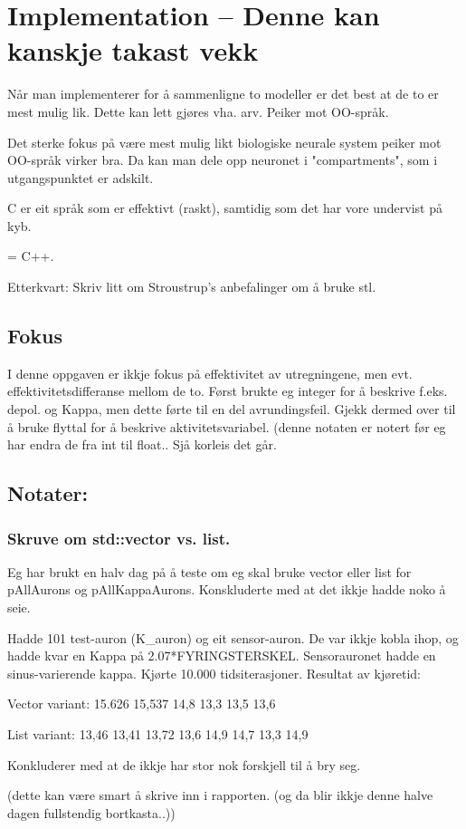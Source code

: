 
\chapter{ Implementation  -- Denne kan kanskje takast vekk}


	Når man implementerer for å sammenligne to modeller er det best at de to er mest mulig lik. Dette kan lett gjøres vha. arv. Peiker mot OO-språk.
	
	Det sterke fokus på være mest mulig likt biologiske neurale system peiker mot OO-språk virker bra. Da kan man dele opp neuronet i "compartments", som i utgangspunktet er adskilt.

	C er eit språk som er effektivt (raskt), samtidig som det har vore undervist på kyb.

	= C++.

	Etterkvart: Skriv litt om Stroustrup's anbefalinger om å bruke stl.




\section{Fokus}
I denne oppgaven er ikkje fokus på effektivitet av utregningene, men evt. effektivitetsdifferanse mellom de to. 
Først brukte eg integer for å beskrive f.eks. depol. og Kappa, men dette førte til en del avrundingsfeil. 
Gjekk dermed over til å bruke flyttal for å beskrive aktivitetsvariabel. (denne notaten er notert før eg har endra de fra int til float.. Sjå korleis det går.



\section{Notater:}
\subsection{Skruve om std::vector vs. list.}
Eg har brukt en halv dag på å teste om eg skal bruke vector eller list for pAllAurons og pAllKappaAurons. Konskluderte med at det ikkje hadde noko å seie.

Hadde 101 test-auron (K\_auron) og eit sensor-auron. De var ikkje kobla ihop, og hadde kvar en Kappa på 2.07*FYRINGSTERSKEL. Sensorauronet hadde en sinus-varierende kappa.
Kjørte 10.000 tidsiterasjoner. Resultat av kjøretid:

Vector variant:
15.626 15,537 14,8 13,3 13,5 13,6

List variant:
13,46 13,41 	13,72 13,6 14,9 14,7 13,3 14,9

Konkluderer med at de ikkje har stor nok forskjell til å bry seg.

(dette kan være smart å skrive inn i rapporten. (og da blir ikkje denne halve dagen fullstendig bortkasta..))

